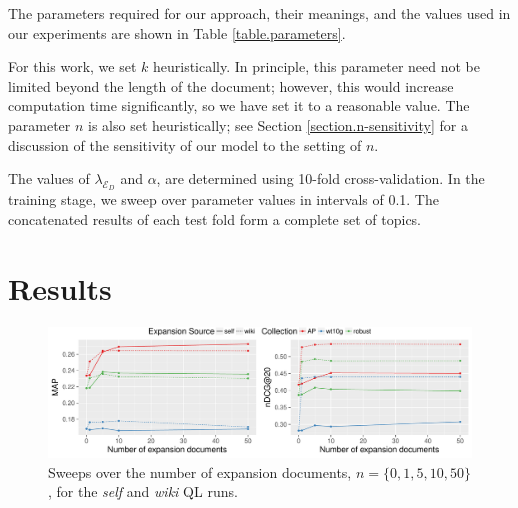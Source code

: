 \documentclass{sig-alternate}
\begin{document}
The parameters required for our approach, their meanings, and the values used in our experiments are shown in Table \ref{table.parameters}. 

For this work, we set $k$ heuristically. In principle, this parameter need not be limited beyond the length of the document; however, this would increase computation time significantly, so we have set it to a reasonable value. The parameter $n$ is also set heuristically; see Section \ref{section.n-sensitivity} for a discussion of the sensitivity of our model to the setting of $n$.

The values of $\lambda_{\mathcal{E}_D}$ and $\alpha$, are determined using 10-fold cross-validation. In the training stage, we sweep over parameter values in intervals of 0.1. The concatenated results of each test fold form a complete set of topics.

\section{Results}\label{section.results}

\begin{figure}
\centering
\includegraphics[width=\linewidth]{figures/expansion-sweep.pdf}
\caption{Sweeps over the number of expansion documents, $n = \{0, 1, 5, 10, 50\}$, for the \textit{self} and \textit{wiki} QL runs.}
\label{figure.n-sweeps}
\end{figure}
\end{document}
